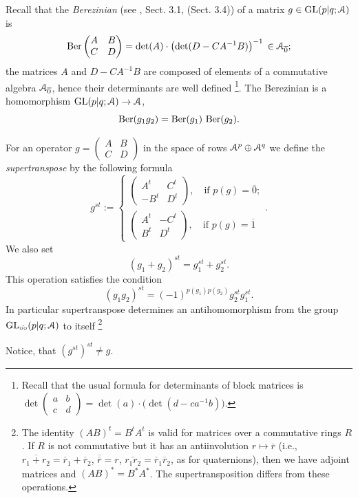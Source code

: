 \documentclass[]{amsart}
\def\GL{\mathrm  {GL}}
\def\B{\mathfrak B}
\newcommand{\Ber}{\mathop{\rm Ber}\nolimits}
\def\cA{\EuScript A}
\def\C {{\mathbb C }}
\def\ov{\overline}
\def\sm{\smallskip}
\def\0{{\ov 0}}
\def\1{{\ov 1}}
\def\vel{{\check{\circ\circ}}}
\begin{document}
Recall that the {\it Berezinian} (see \cite{Ber-super}, Sect. 3.1, \cite{Rog}
 (Sect. 3.4)) of a matrix $g\in \GL(p|q;\cA)$
is
$$
\Ber\begin{pmatrix}A&B\\C&D
\end{pmatrix}=
\det (A)\cdot \bigl(\det(D-CA^{-1}B)\bigr)^{-1}\,\in\cA_\0;
$$
the matrices $A$ and $D-CA^{-1}B$ are composed 
of elements of a commutative algebra $\cA_\0$,
hence their determinants are well defined%
\footnote{Recall that the usual formula for determinants 
of block matrices is $\det \begin{pmatrix}a&b\\c&d
\end{pmatrix}=
\det (a)\cdot \bigl(\det(d-ca^{-1}b)\bigr)$.}.
The Berezinian is a homomorphism $\GL(p|q;\cA)\to\cA$,
$$
\Ber(g_1 g_2)=\Ber(g_1)\,\Ber(g_2).
$$

\sm


For an operator $g=\begin{pmatrix}A&B\\C&D
\end{pmatrix}$  in the space of rows $\cA^p\oplus \cA^q$
we define the {\it supertranspose} by the following formula
$$
g^{st}:= 
\begin{cases}
\begin{pmatrix}A^t&C^t\\-B^t&D^t\end{pmatrix},\quad \text{if $p(g)=\0$};
		\\
\begin{pmatrix}A^t&-C^t\\B^t&D^t\end{pmatrix},\quad \text{if $p(g)=\1$}	
\end{cases}.
$$
We also set 
$$(g_1+g_2)^{st}=g_1^{st}+g_2^{st}.$$
This operation satisfies the condition
$$
(g_1 g_2)^{st}=(-1)^{p(g_1)p(g_2)} g_2^{st} g_1^{st}.
$$
In particular supertranspose determines 
an antihomomorphism 
from the group 
$\GL_\vel(p|q;\cA)$ to itself%
\footnote{The identity $(AB)^t=B^t A^t$ is valid for matrices over
a commutative rings $R$. If $R$ is not commutative but it has an
antiinvolution $r\mapsto \ov r$ (i.e., $\ov {r_1+r_2}=\ov r_1+\ov r_2$,
$\ov{\ov r}=r$, $\ov {r_1 r_2}=\ov r_1 \ov r_2$, as for quaternions),
then we have adjoint matrices and $(AB)^*=B^* A^*$. The supertransposition differs from these operations.} 

Notice, that $(g^{st})^{st}\ne g$.

\sm 
\end{document}
